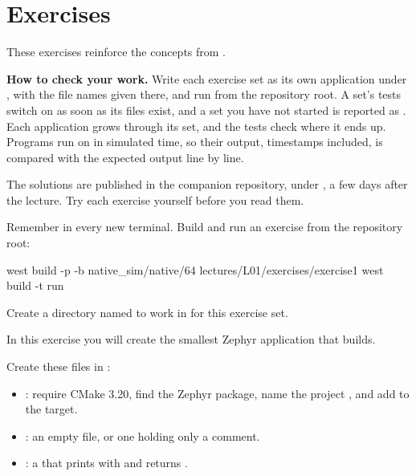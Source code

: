 
\section{Exercises}
\label{c1:sec:exercises}\label{c1:app:c}
These exercises reinforce the concepts from .

\begin{aside}
\textbf{How to check your work.} Write each exercise set as its own application under
, with the file names given there, and run  from the
repository root. A set’s tests switch on as soon as its files exist, and a set you have not started
is reported as . Each application grows through its set, and the tests check where it
ends up. Programs run on  in simulated time, so their output, timestamps included,
is compared with the expected output line by line.

The solutions are published in the companion repository, under
, a few days after the lecture. Try each exercise yourself
before you read them.
\end{aside}

Remember  in every new terminal. Build and run an exercise from the repository
root:

\begin{shell}
west build -p -b native_sim/native/64 lectures/L01/exercises/exercise1
west build -t run
\end{shell}

\label{c1:set:1}
Create a directory named  to work in for this exercise set.

\label{c1:ex:1.1}
In this exercise you will create the smallest Zephyr application that builds.

Create these files in :

\begin{itemize}
  \item {}: require CMake 3.20, find the Zephyr package, name the project
    , and add  to the  target.
  \item {}: an empty file, or one holding only a comment.
  \item {}: a  that prints  with  and
    returns .
\end{itemize}

